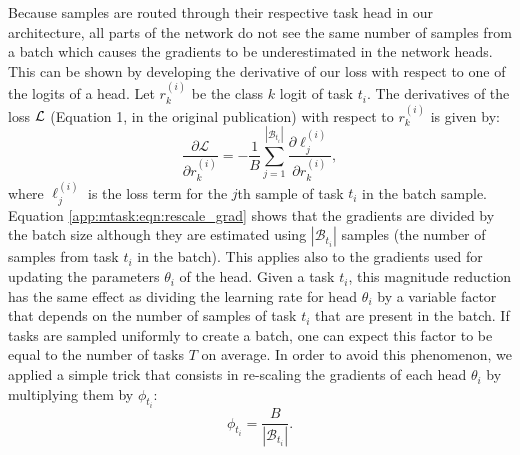 Because samples are routed through their respective task head in our architecture, all parts of the network do not see the same number of samples from a batch which causes the gradients to be underestimated in the network heads. This can be shown by developing the derivative of our loss with respect to one of the logits of a head. Let $r^{(i)}_{k}$ be the class $k$ logit of task $t_i$. The derivatives of the loss ${\cal L}$ (Equation 1, in the original publication) with respect to $r^{(i)}_k$ is given by:
\begin{equation} 
    \label{app:mtask:eqn:rescale_grad}
    \frac{\partial \mathcal{L}}{\partial r^{(i)}_{k}} = - \frac{1}{B} \sum_{j=1}^{\left|\mathcal{B}_{t_i}\right|} \frac{\partial \ell^{(i)}_j}{\partial r^{(i)}_{k}},
\end{equation}
where $\ell^{(i)}_j$ is the loss term for the $j$th sample of task $t_i$ in the batch sample. Equation \ref{app:mtask:eqn:rescale_grad} shows that the gradients are divided by the batch size although they are estimated using $\left|\mathcal{B}_{t_i}\right|$ samples (\ie the number of samples from task $t_i$ in the batch). This applies also to the gradients used for updating the parameters $\theta_i$ of the head. Given a task $t_i$, this magnitude reduction has the same effect as dividing the learning rate for head $\theta_i$ by a variable factor that depends on the number of samples of task $t_i$ that are present in the batch. If tasks are sampled uniformly to create a batch, one can expect this factor to be equal to the number of tasks $T$ on average. In order to avoid this phenomenon, we applied a simple trick that consists in re-scaling the gradients of each head $\theta_i$ by multiplying them by $\phi_{t_i}$:
\begin{equation}
\phi_{t_i} = \frac{B}{\left|\mathcal{B}_{t_i}\right|}.
\end{equation}



